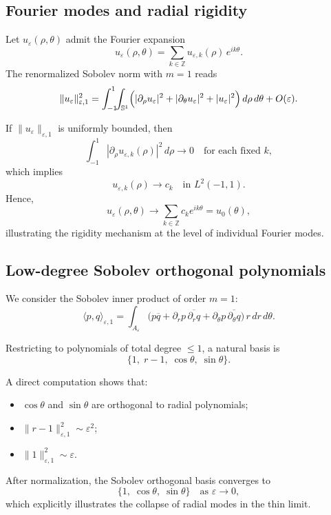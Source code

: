 \documentclass[11pt]{amsart}
\theoremstyle{plain}
\theoremstyle{definition}
\theoremstyle{remark}
\theoremstyle{remark}
\begin{document}
\subsection{Fourier modes and radial rigidity}

Let $u_\varepsilon(\rho,\theta)$ admit the Fourier expansion
\[
u_\varepsilon(\rho,\theta)
=
\sum_{k\in\mathbb Z} u_{\varepsilon,k}(\rho)\,e^{ik\theta}.
\]
The renormalized Sobolev norm with $m=1$ reads
\[
\|u_\varepsilon\|_{\varepsilon,1}^2
=
\int_{-1}^1\!\!\int_{\mathbb S^1}
\Bigl(
|\partial_\rho u_\varepsilon|^2
+
|\partial_\theta u_\varepsilon|^2
+
|u_\varepsilon|^2
\Bigr)
\,d\rho\,d\theta
+
O(\varepsilon).
\]

If $\|u_\varepsilon\|_{\varepsilon,1}$ is uniformly bounded, then
\[
\int_{-1}^1 |\partial_\rho u_{\varepsilon,k}(\rho)|^2\,d\rho \longrightarrow 0
\quad\text{for each fixed }k,
\]
which implies
\[
u_{\varepsilon,k}(\rho)\longrightarrow c_k
\quad\text{in }L^2(-1,1).
\]
Hence,
\[
u_\varepsilon(\rho,\theta)\longrightarrow
\sum_{k\in\mathbb Z} c_k e^{ik\theta}
=
u_0(\theta),
\]
illustrating the rigidity mechanism at the level of individual Fourier modes.

\subsection{Low-degree Sobolev orthogonal polynomials}

We consider the Sobolev inner product of order $m=1$:
\[
\langle p,q\rangle_{\varepsilon,1}
=
\int_{A_\varepsilon}
\bigl(
p\overline q
+
\partial_r p\,\overline{\partial_r q}
+
\partial_\theta p\,\overline{\partial_\theta q}
\bigr)
\,r\,dr\,d\theta.
\]

Restricting to polynomials of total degree $\le1$, a natural basis is
\[
\{1,\; r-1,\; \cos\theta,\; \sin\theta\}.
\]

A direct computation shows that:
\begin{itemize}
\item $\cos\theta$ and $\sin\theta$ are orthogonal to radial polynomials;
\item $\|r-1\|^2_{\varepsilon,1}\sim \varepsilon^2$;
\item $\|1\|^2_{\varepsilon,1}\sim \varepsilon$.
\end{itemize}

After normalization, the Sobolev orthogonal basis converges to
\[
\{1,\;\cos\theta,\;\sin\theta\}
\quad\text{as }\varepsilon\to0,
\]
which explicitly illustrates the collapse of radial modes in the thin limit.
\end{document}

